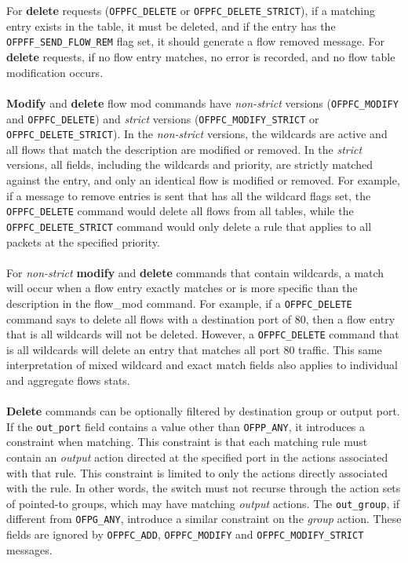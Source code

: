 \documentclass[10pt]{article}
\begin{document}
\\\\
For \textbf{delete} requests (\verb|OFPFC_DELETE| or \verb|OFPFC_DELETE_STRICT|), if a matching entry exists in the table, it must be deleted, and if the entry has the \verb|OFPFF_SEND_FLOW_REM| flag set, it should generate a flow removed message. For \textbf{delete} requests, if no flow entry matches, no error is recorded, and no flow table modification occurs.
\\\\
\textbf{Modify} and \textbf{delete} flow mod commands have \emph{non-strict} versions (\verb|OFPFC_MODIFY| and \verb|OFPFC_DELETE|) and \emph{strict} versions (\verb|OFPFC_MODIFY_STRICT| or \verb|OFPFC_DELETE_STRICT|). In the \emph{non-strict} versions, the wildcards are active and all flows that match the description are modified or removed. In the \emph{strict} versions, all fields, including the wildcards and priority, are strictly matched against the entry, and only an identical flow is modified or removed.  For example, if a message to remove entries is sent that has all the wildcard flags set, the \verb|OFPFC_DELETE| command would delete all flows from all tables, while the \verb|OFPFC_DELETE_STRICT| command would only delete a rule that applies to all packets at the specified priority.
\\\\
For \emph{non-strict} \textbf{modify} and \textbf{delete} commands that contain wildcards, a match will occur when a flow entry exactly matches or is more specific than the description in the flow\_mod command. For example, if a \verb|OFPFC_DELETE| command says to delete all flows with a destination port of 80, then a flow entry that is all wildcards will not be deleted. However, a \verb|OFPFC_DELETE| command that is all wildcards will delete an entry that matches all port 80 traffic.  This same interpretation of mixed wildcard and exact match fields also applies to individual and aggregate flows stats.
\\\\
\textbf{Delete} commands can be optionally filtered by destination group or output port.  If the \verb|out_port| field contains a value other than \verb|OFPP_ANY|, it introduces a constraint when matching.  This constraint is that each matching rule must contain an \emph{output} action directed at the specified port in the actions associated with that rule.  This constraint is limited to only the actions directly associated with the rule.  In other words, the switch must not recurse through the action sets of pointed-to groups, which may have matching \emph{output} actions.  The \verb|out_group|, if different from \verb|OFPG_ANY|, introduce a similar constraint on the \emph{group} action. These fields are ignored by \verb|OFPFC_ADD|, \verb|OFPFC_MODIFY| and \verb|OFPFC_MODIFY_STRICT| messages.
\end{document}
